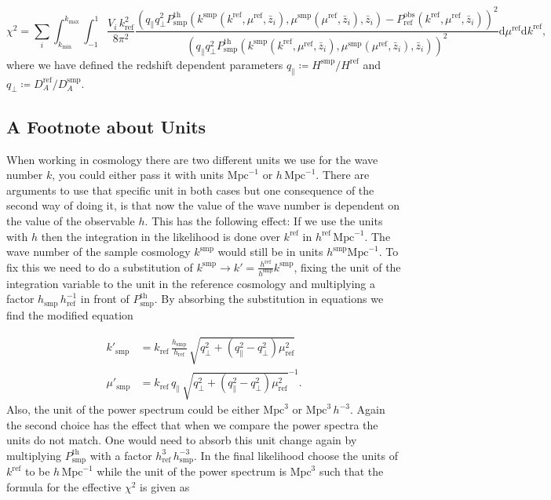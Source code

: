 \documentclass[oneside]{book}
\newcommand*{\rd}{\mathrm{d}}
\begin{document}
\begin{equation*}
    \chi^2 = \sum_i \int_{k_\mathrm{min}}^{k_\mathrm{max}} \int_{-1}^{1} \frac{V_i\, k_\mathrm{ref}^2 }{8 \pi^2} 
    \frac{\left( q_\| q_\perp^2 P^\mathrm{th}_\mathrm{smp}(k^\mathrm{smp}(k^\mathrm{ref},\mu^\mathrm{ref},\bar{z}_i),\mu^\mathrm{smp}(\mu^\mathrm{ref},\bar{z}_i),\bar{z}_i)
    -P_\mathrm{ref}^\mathrm{obs}(k^\mathrm{ref},\mu^\mathrm{ref},\bar{z}_i)\right)^2}
    {\left( q_\| q_\perp^2 P^\mathrm{th}_\mathrm{smp}(k^\mathrm{smp}(k^\mathrm{ref},\mu^\mathrm{ref},\bar{z}_i),\mu^\mathrm{smp}(\mu^\mathrm{ref},\bar{z}_i),\bar{z}_i)\right)^2} \rd \mu^\mathrm{ref} \rd k^\mathrm{ref},
\end{equation*}
where we have defined the redshift dependent parameters $q_\| \coloneq H^\mathrm{smp}/H^\mathrm{ref}$ and $q_\perp \coloneq D_A^\mathrm{ref}/D_A^\mathrm{smp}$.\\

\subsection*{A Footnote about Units} 
When working in cosmology there are two different units we use for the wave number $k$, you could either pass it with units $\mathrm{Mpc}^{-1}$ or $h\,\mathrm{Mpc}^{-1}$. There are arguments to use that specific unit in both cases but one consequence of the second way of doing it, is that now the value of the wave number is dependent on the value of the observable $h$. This has the following effect: If we use the units with $h$ then the integration in the likelihood is done over $k^\mathrm{ref}$ in $h^\mathrm{ref} \,\mathrm{Mpc}^{-1}$. The wave number of the sample cosmology $k^\mathrm{smp}$ would still be in units $h^\mathrm{smp} \mathrm{Mpc}^{-1}$. To fix this we need to do a substitution of $k^\mathrm{smp}\to k' = \frac{h^\mathrm{ref}}{h^\mathrm{smp}} k^\mathrm{smp}$,  fixing the unit of the integration variable to the unit in the reference cosmology and multiplying a factor $h_\mathrm{smp}\,h_\mathrm{ref}^{-1}$ in front of $P^\mathrm{th}_\mathrm{smp}$. By absorbing  the substitution in equations  we find the modified equation 

 \begin{align*}
    k'_\mathrm{smp} &= k_\mathrm{ref}\,\frac{h_\mathrm{smp}}{h_\mathrm{ref}}\,\sqrt{q^2_\perp + \left(q_\|^2-q_\perp^2\right)\mu_\mathrm{ref}^2} \\
    \mu'_\mathrm{smp} &= k_\mathrm{ref}\, q_\|\,\sqrt{q^2_\perp + \left(q_\|^2-q_\perp^2\right)\mu_\mathrm{ref}^2}^{-1}.
 \end{align*}
Also, the unit of the power spectrum could be either $\mathrm{Mpc}^3$ or $\mathrm{Mpc}^3\, h^{-3}$. Again the second choice has the effect that when we compare the power spectra the units
do not match. One would need to absorb this unit change again by multiplying $P^\mathrm{th}_\mathrm{smp}$ with a factor $h_\mathrm{ref}^3\,h_\mathrm{smp}^{-3}$. In the final
likelihood choose the units of $k^\mathrm{ref}$ to be $h\, \mathrm{Mpc}^{-1}$ while the unit of the power spectrum is $\mathrm{Mpc}^3$ such that the formula for the effective $\chi^2$ is given as 
\end{document}
